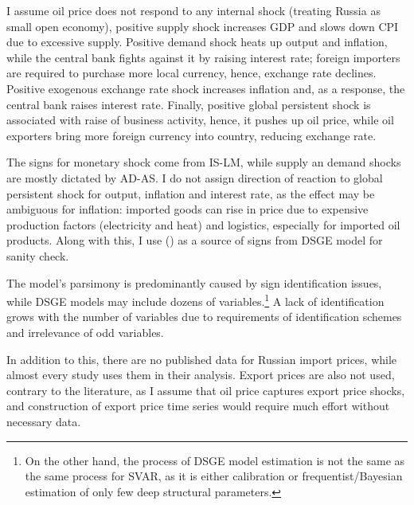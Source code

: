 \documentclass[12pt, a4paper]{extarticle}
\begin{document}
I assume oil price does not respond to any internal shock (treating Russia as small open economy), positive supply shock increases GDP and slows down CPI due to excessive supply. Positive demand shock heats up output and inflation, while the central bank fights against it by raising interest rate; foreign importers are required to purchase more local currency, hence, exchange rate declines. Positive exogenous exchange rate shock increases inflation and, as a response, the central bank raises interest rate. Finally, positive global persistent shock is associated with raise of business activity, hence, it pushes up oil price, while oil exporters bring more foreign currency into country, reducing exchange rate.

The signs for monetary shock come from IS-LM, while supply an demand shocks are mostly dictated by AD-AS. I do not assign direction of reaction to global persistent shock for output, inflation and interest rate, as the effect may be ambiguous for inflation: imported goods can rise in price due to expensive production factors (electricity and heat) and logistics, especially for imported oil products. Along with this, I use (\cite{Kreptsev2017}) as a source of signs from DSGE model for sanity check.

The model's parsimony is predominantly caused by sign identification issues, while DSGE models may include dozens of variables.\footnote{On the other hand, the process of DSGE model estimation is not the same as the same process for SVAR, as it is either calibration or frequentist/Bayesian estimation of only few deep structural parameters.} A lack of identification grows with the number of variables due to requirements of identification schemes and irrelevance of odd variables.

In addition to this, there are no published data for Russian import prices, while almost every study uses them in their analysis. Export prices are also not used, contrary to the literature, as I assume that oil price captures export price shocks, and construction of export price time series would require much effort without necessary data.
\end{document}

